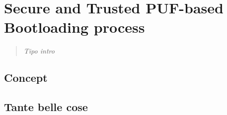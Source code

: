 \documentclass[../tesi.tex]{subfiles}
\begin{document}
\chapter{Secure and Trusted PUF-based Bootloading process}
\begin{quotation}
\emph{Tipo intro}
\end{quotation}

\section{Concept}

\section{Tante belle cose}
\end{document}
